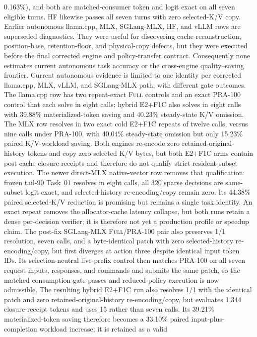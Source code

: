 \documentclass[11pt]{article}
\begin{document}
0.163\%), and both are matched-consumer token
and logit exact on all seven eligible turns.  HF likewise passes all seven turns
with zero selected-K/V copy.  Earlier autonomous llama.cpp, MLX,
SGLang-MLX, HF, and vLLM rows are superseded diagnostics.  They were useful
for discovering cache-reconstruction, position-base, retention-floor, and
physical-copy defects, but they were executed before the final corrected engine
and policy-transfer contract.  Consequently none estimates current autonomous
task accuracy or the cross-engine quality--saving frontier.  Current autonomous
evidence is limited to one identity per corrected llama.cpp, MLX, vLLM, and
SGLang-MLX path, with different gate outcomes.  The
llama.cpp row has two repeat-exact \textsc{Full} controls and an exact PRA-100
control that each solve in eight calls; hybrid E2+F1C also solves in eight calls with
39.88\% materialized-token saving and 40.23\% steady-state K/V omission.  The
MLX row resolves in two exact cold E2+F1C repeats of twelve calls, versus nine
calls under PRA-100, with 40.04\% steady-state omission but only 15.23\% paired
K/V-workload saving.  Both engines re-encode zero retained-original-history
tokens and copy zero selected K/V bytes, but both E2+F1C arms contain post-cache
closure receipts and therefore do not qualify strict resident-subset execution.
The newer direct-MLX native-vector row removes that qualification: frozen
tail-90 Task~01 resolves in eight calls, all 320 sparse decisions are
same-subset logit exact, and selected-history re-encoding/copy remain zero.
Its 44.38\% paired selected-K/V reduction is promising but remains a single
task identity.  An exact repeat removes the allocator-cache latency collapse,
but both runs retain a dense per-decision verifier; it is therefore not yet a
production profile or speedup claim.
The
post-fix SGLang-MLX \textsc{Full}/PRA-100 pair also preserves 1/1 resolution,
seven calls, and a byte-identical patch with zero selected-history
re-encoding/copy, but first diverges at action three despite identical input
token IDs.  Its selection-neutral live-prefix control then matches PRA-100 on
all seven request inputs, responses, and commands and submits the same patch,
so the matched-consumption gate passes and reduced-policy execution is now
admissible.  The resulting hybrid E2+F1C run also resolves 1/1 with the identical
patch and zero retained-original-history re-encoding/copy, but evaluates 1,344
closure-receipt tokens and uses 15 rather than seven
calls.  Its 39.21\% materialized-token saving therefore becomes a 33.10\%
paired input-plus-completion workload increase; it is retained as a valid
\end{document}
